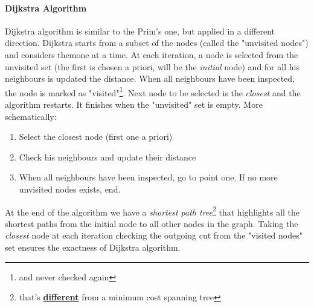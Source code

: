 \documentclass{article}
\begin{document}
			\paragraph{Dijkstra Algorithm}
				Dijkstra algorithm is similar to the Prim's one, but applied in a different direction. Dijkstra starts from a subset of the nodes (called the "unvisited nodes") and considers themone at a time. At each iteration, a node is selected from the unvisited set (the first is chosen a priori, will be the \textit{initial} node) and for all his neighbours is updated the distance. When all neighbours have been inspected, the node is marked as "visited"\footnote{and never checked again}. Next node to be selected is the \textit{closest} and the algorithm restarts. It finishes when the "unvisited" set is empty. More schematically:
				\begin{enumerate}
					\item Select the closest node (first one a priori)
					\item Check his neighbours and update their distance
					\item When all neighbours have been inspected, go to point one. If no more unvisited nodes exists, end.
				\end{enumerate}
				At the end of the algorithm we have a \textit{shortest path tree}\footnote{that's \underline{\textbf{different}} from a minimum cost spanning tree} that highlights all the shortest paths from the initial node to all other nodes in the graph. Taking the \textit{closest} node at each iteration checking the outgoing cut from the "visited nodes" set ensures the exactness of Dijkstra algorithm.
\end{document}
